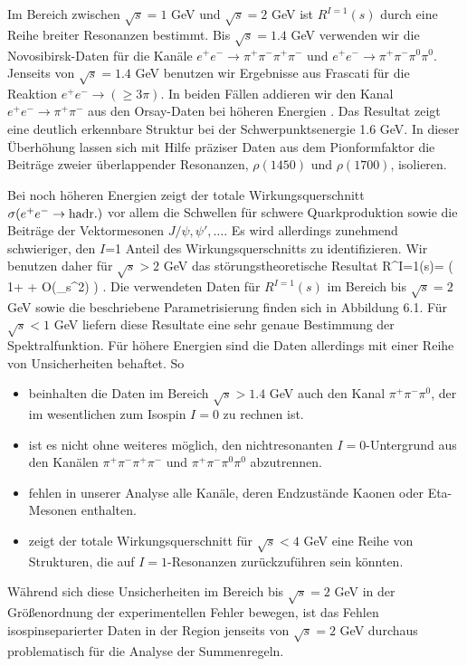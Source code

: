 Im Bereich zwischen  $\sqrt s=1$ GeV und $\sqrt s=2$ GeV ist 
$R^{I=1}(s)$ durch eine Reihe breiter Resonanzen bestimmt. Bis
$\sqrt s=1.4$ GeV verwenden wir die Novosibirsk-Daten \cite{Sid76}
f\"ur die Kan\"ale $e^+e^-\to \pi^+\pi^-\pi^+\pi^-$ und $e^+e^-\to 
\pi^+\pi^-\pi^0\pi^0$. Jenseits von $\sqrt s=1.4$ GeV benutzen wir 
Ergebnisse aus Frascati \cite{Bac79} f\"ur die Reaktion $e^+e^-\to
(\ge 3\pi )$. In beiden F\"allen addieren wir den Kanal $e^+e^-\to\pi^+\pi^-$
aus den Orsay-Daten bei h\"oheren Energien \cite{Bis89}. Das Resultat 
zeigt eine deutlich erkennbare Struktur bei der Schwerpunktsenergie 
1.6 GeV. In dieser \"Uberh\"ohung lassen sich mit Hilfe pr\"aziser
Daten aus dem Pionformfaktor  die Beitr\"age
zweier \"uberlappender Resonanzen, $\rho(1450)$ und $\rho(1700)$, 
isolieren.  

Bei noch h\"oheren Energien zeigt der totale Wirkungsquerschnitt 
$\sigma (e^+e^-\to \rm hadr.)$ vor allem die Schwellen f\"ur schwere
Quarkproduktion sowie die Beitr\"age der Vektormesonen 
$J/\psi,\psi ',\ldots$. Es wird allerdings zunehmend schwieriger, den 
$I$=1 Anteil des Wirkungsquerschnitts zu  identifizieren. Wir 
benutzen daher f\"ur $\sqrt s>2$ GeV das st\"orungstheoretische 
Resultat 
\be
 R^{I=1}(s)= \left( 1+
  + {\cal O}(\alpha_s^2) \right) .
\ee
Die verwendeten Daten f\"ur $R^{I=1}(s)$ im Bereich bis $\sqrt s=2$
GeV sowie die beschriebene Parametrisierung finden sich  in Abbildung 6.1.
F\"ur $\sqrt s<1$ GeV liefern diese Resultate eine sehr genaue 
Bestimmung der Spektralfunktion. F\"ur h\"ohere Energien sind die
Daten allerdings mit einer Reihe von Unsicherheiten behaftet. So
\begin{itemize}
\item{beinhalten die Daten im Bereich $\sqrt s>1.4$ GeV auch den 
Kanal $\pi^+\pi^-\pi^0$, der im wesentlichen zum Isospin $I\!=\!0$
zu rechnen ist.}
\item{ist es nicht ohne weiteres m\"oglich, den nichtresonanten 
$I\!=\!0$-Untergrund aus den Kan\"alen $\pi^+\pi^-\pi^+\pi^-$ und 
$\pi^+\pi^-\pi^0\pi^0$ abzutrennen.}
\item{fehlen in unserer Analyse alle Kan\"ale, deren Endzust\"ande
 Kaonen oder Eta-Mesonen enthalten.}
\item{zeigt der totale Wirkungsquerschnitt f\"ur $\sqrt s<4$ GeV
eine Reihe von Strukturen, die auf $I\!=\!1$-Resonanzen zur\"uckzuf\"uhren
sein k\"onnten.}
\end{itemize}
W\"ahrend sich diese Unsicherheiten im Bereich bis $\sqrt s=2$ GeV 
in der Gr\"o\ss enordnung der experimentellen Fehler bewegen, ist 
das Fehlen isospinseparierter Daten in der Region jenseits von
$\sqrt s=2$ GeV durchaus problematisch f\"ur die Analyse der
Summenregeln.

